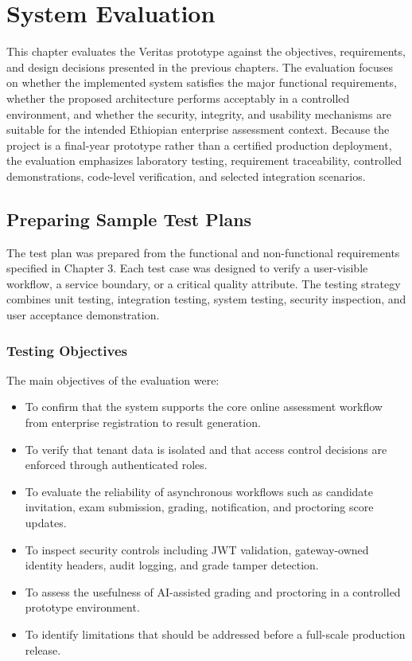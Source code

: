 \section{System Evaluation}

This chapter evaluates the Veritas prototype against the objectives, requirements, and design decisions presented in the previous chapters. The evaluation focuses on whether the implemented system satisfies the major functional requirements, whether the proposed architecture performs acceptably in a controlled environment, and whether the security, integrity, and usability mechanisms are suitable for the intended Ethiopian enterprise assessment context. Because the project is a final-year prototype rather than a certified production deployment, the evaluation emphasizes laboratory testing, requirement traceability, controlled demonstrations, code-level verification, and selected integration scenarios.

\subsection{Preparing Sample Test Plans}
The test plan was prepared from the functional and non-functional requirements specified in Chapter 3. Each test case was designed to verify a user-visible workflow, a service boundary, or a critical quality attribute. The testing strategy combines unit testing, integration testing, system testing, security inspection, and user acceptance demonstration.

\subsubsection{Testing Objectives}
The main objectives of the evaluation were:
\begin{itemize}
    \item To confirm that the system supports the core online assessment workflow from enterprise registration to result generation.
    \item To verify that tenant data is isolated and that access control decisions are enforced through authenticated roles.
    \item To evaluate the reliability of asynchronous workflows such as candidate invitation, exam submission, grading, notification, and proctoring score updates.
    \item To inspect security controls including JWT validation, gateway-owned identity headers, audit logging, and grade tamper detection.
    \item To assess the usefulness of AI-assisted grading and proctoring in a controlled prototype environment.
    \item To identify limitations that should be addressed before a full-scale production release.
\end{itemize}

